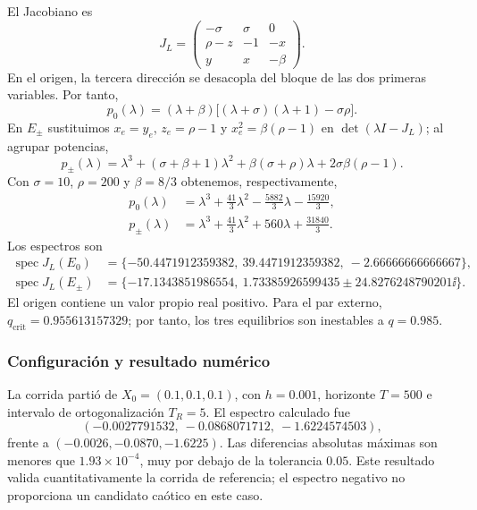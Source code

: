 El Jacobiano es
\begin{equation}
 J_L=\begin{pmatrix}
 -\sigma&\sigma&0\\
 \rho-z&-1&-x\\
 y&x&-\beta
 \end{pmatrix}.
\end{equation}
En el origen, la tercera dirección se desacopla del bloque de las dos
primeras variables. Por tanto,
\[
 p_0(\lambda)=(\lambda+\beta)
 \bigl[(\lambda+\sigma)(\lambda+1)-\sigma\rho\bigr].
\]
En $E_\pm$ sustituimos $x_e=y_e$, $z_e=\rho-1$ y
$x_e^2=\beta(\rho-1)$ en $\det(\lambda I-J_L)$; al agrupar potencias,
\[
 p_\pm(\lambda)=\lambda^3+(\sigma+\beta+1)\lambda^2
 +\beta(\sigma+\rho)\lambda+2\sigma\beta(\rho-1).
\]
Con $\sigma=10$, $\rho=200$ y $\beta=8/3$ obtenemos, respectivamente,
\begin{align}
 p_0(\lambda)&=\lambda^3+\frac{41}{3}\lambda^2
 -\frac{5882}{3}\lambda-\frac{15920}{3},\\
 p_{\pm}(\lambda)&=\lambda^3+\frac{41}{3}\lambda^2
 +560\lambda+\frac{31840}{3}.
\end{align}
Los espectros son
\begin{align}
 \operatorname{spec}J_L(E_0)&=
 \{-50.4471912359382,\ 39.4471912359382,\ -2.66666666666667\},\\
 \operatorname{spec}J_L(E_{\pm})&=
 \{-17.1343851986554,\ 1.73385926599435
 \pm24.8276248790201\ii\}.
\end{align}
El origen contiene un valor propio real positivo. Para el par externo,
\(q_{\mathrm{crit}}=0.955613157329\); por tanto, los tres equilibrios son
inestables a \(q=0.985\).

\subsubsection*{Configuración y resultado numérico}

La corrida partió de \(X_0=(0.1,0.1,0.1)\), con \(h=0.001\), horizonte
\(T=500\) e intervalo de ortogonalización \(T_R=5\). El espectro calculado fue
\begin{equation}
 (-0.0027791532,\ -0.0868071712,\ -1.6224574503),
\end{equation}
frente a \((-0.0026,-0.0870,-1.6225)\). Las diferencias absolutas máximas son
menores que \(1.93\times10^{-4}\), muy por debajo de la tolerancia \(0.05\).
Este resultado valida cuantitativamente la corrida de referencia; el espectro
negativo no proporciona un candidato caótico en este caso.

